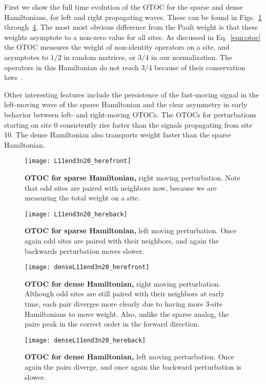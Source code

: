 First we show the full time evolution of the OTOC for the sparse and dense Hamiltonians, for left and right propagating waves. These can be found in Figs.~\ref{fig:L11end3n20_herefront} through~\ref{fig:denseL11end3n20_hereback}. The most most obvious difference from the Pauli weight is that these weights asymptote to a non-zero value for all sites. As discussed in Eq.~\ref{eqn:otoc} the OTOC measures the weight of non-identity operators on a site, and asymptotes to $1/2$ in random matrices, or $3/4$ in our normalization. The operators in this Hamiltonian do not reach $3/4$ because of their conservation laws~\cite{Jonay17, Jonay18}.

Other interesting features include the persistence of the fast-moving signal in the left-moving wave of the sparse Hamiltonian and the clear asymmetry in early behavior between left- and right-moving OTOCs. The OTOCs for perturbations starting on site 0 consistently rise faster than the signals propagating from site 10. The dense Hamiltonian also transports weight faster than the sparse Hamiltonian.

\begin{figure}
	\centering
	\texttt{[image: L11end3n20\_herefront]}
	\caption{\textbf{OTOC for sparse Hamiltonian,} right moving perturbation. Note that odd sites are paired with neighbors now, because we are measuring the total weight on a site.}
	\label{fig:L11end3n20_herefront}
\end{figure}

\begin{figure}
	\centering
	\texttt{[image: L11end3n20\_hereback]}
	\caption{\textbf{OTOC for sparse Hamiltonian,} left moving perturbation. Once again odd sites are paired with their neighbors, and again the backwards perturbation moves slower.}
	\label{fig:L11end3n20_hereback}
\end{figure}

\begin{figure}
	\centering
	\texttt{[image: denseL11end3n20\_herefront]}
	\caption{\textbf{OTOC for dense Hamiltonian,} right moving perturbation. Although odd sites are still paired with their neighbors at early time, each pair diverges more clearly due to having more 3-site Hamiltonians to move weight. Also, unlike the sparse analog, the pairs peak in the correct order in the forward direction.}
	\label{fig:denseL11end3n20_herefront}
\end{figure}

\begin{figure}
	\centering
	\texttt{[image: denseL11end3n20\_hereback]}
	\caption{\textbf{OTOC for dense Hamiltonian,} left moving perturbation. Once again the pairs diverge, and once again the backward perturbation is slower.}
	\label{fig:denseL11end3n20_hereback}
\end{figure}

